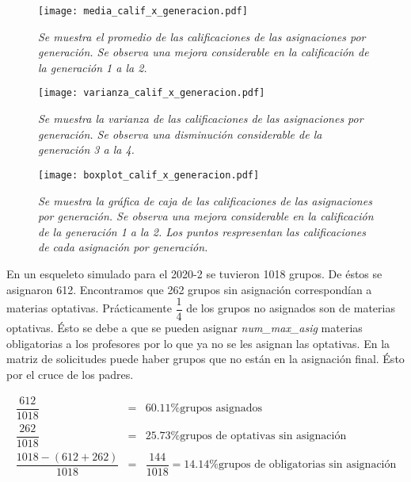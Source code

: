 \begin{figure}[H]
\centering
\texttt{[image: media\_calif\_x\_generacion.pdf]} %
\caption[\textit{Media de calificaciones de asignaciones por generación}]{\textit{Se muestra el promedio de las calificaciones de las asignaciones por generación. Se observa una mejora considerable en la calificación de la generación 1 a la 2.}}\label{media_calif_x_generacion}
\end{figure}


\begin{figure}[H]
\centering
\texttt{[image: varianza\_calif\_x\_generacion.pdf]} %
\caption[\textit{Varianza de calificaciones de asignaciones por generación}]{\textit{Se muestra la varianza de las calificaciones de las asignaciones por generación. Se observa una disminución considerable de la generación 3 a la 4.}}\label{vaar_calif_x_generacion}
\end{figure}


\begin{figure}[H]
\centering
\texttt{[image: boxplot\_calif\_x\_generacion.pdf]} %
\caption[\textit{Gráfica de caja de calificaciones de asignaciones por generación}]{\textit{Se muestra la gráfica de caja de las calificaciones de las asignaciones por generación. Se observa una mejora considerable en la calificación de la generación 1 a la 2. Los puntos respresentan las calificaciones de cada asignación por generación.}}\label{boxplot_calif_x_generacion}
\end{figure}



En un esqueleto simulado para el 2020-2 se tuvieron 1018 grupos. De éstos se asignaron 612. Encontramos que 262 grupos sin asignación correspondían a materias optativas. Prácticamente $\dfrac{1}{4}$ de los grupos no asignados son de materias optativas. Ésto se debe a que se pueden asignar \textit{num\_max\_asig} materias obligatorias a los profesores por lo que ya no se les asignan las optativas. En la matriz de solicitudes puede haber grupos que no están en la asignación final. Ésto por el cruce de los padres.

\begin{eqnarray*}
\dfrac{612}{1018} &=& 60.11\% \text{grupos asignados}\\
\dfrac{262}{1018} &=& 25.73\% \text{grupos de optativas sin asignación}\\
\dfrac{1018 - (612 + 262)}{1018} &=& \dfrac{144}{1018} = 14.14\% \text{grupos de obligatorias sin asignación}
\end{eqnarray*}


